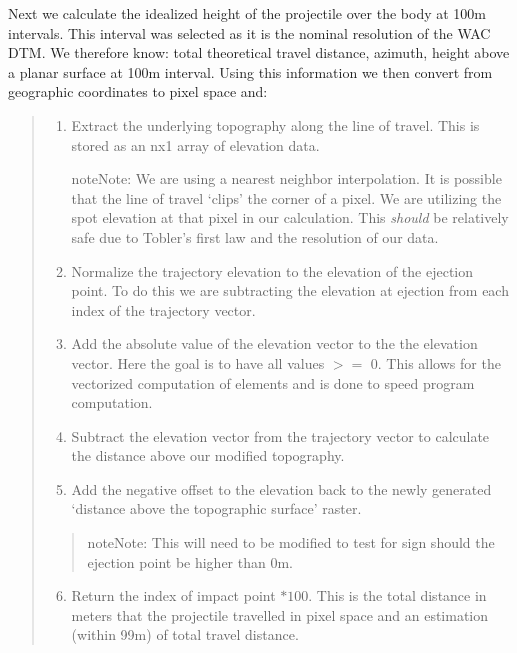 \documentclass[letterpaper,10pt,english]{sphinxmanual}
\begin{document}
Next we calculate the idealized height of the projectile over the body at 100m intervals.  This interval was selected as it is the nominal resolution of the WAC DTM.  We therefore know: total theoretical travel distance,  azimuth, height above a planar surface at 100m interval.  Using this information we then convert from geographic coordinates to pixel space and:
\begin{quote}
\begin{enumerate}
\item {} 
Extract the underlying topography along the line of travel.  This is stored as an nx1 array of elevation data.

\begin{notice}{note}{Note:}
We are using a nearest neighbor interpolation.  It is possible that the line of travel `clips' the corner of a pixel.  We are utilizing the spot elevation at that pixel in our calculation.  This \emph{should} be relatively safe due to Tobler's first law and the resolution of our data.
\end{notice}

\item {} 
Normalize the trajectory elevation to the elevation of the ejection point.  To do this we are subtracting the elevation at ejection from each index of the trajectory vector.

\item {} 
Add the absolute value of the elevation vector to the the elevation vector.  Here the goal is to have all values $>=$ 0.  This allows for the vectorized computation of elements and is done to speed program computation.

\item {} 
Subtract the elevation vector from the trajectory vector to calculate the distance above our modified topography.

\item {} 
Add the negative offset to the elevation back to the newly generated `distance above the topographic surface' raster.

\end{enumerate}
\begin{quote}

\begin{notice}{note}{Note:}
This will need to be modified to test for sign should the ejection point be higher than 0m.
\end{notice}
\end{quote}
\begin{enumerate}
\setcounter{enumi}{5}
\item {} 
Return the index of impact point $* 100$.  This is the total distance in meters that the projectile travelled in pixel space and an estimation (within 99m) of total travel distance.

\end{enumerate}
\end{quote}



\renewcommand{\indexname}{Index}
\printindex
\end{document}
